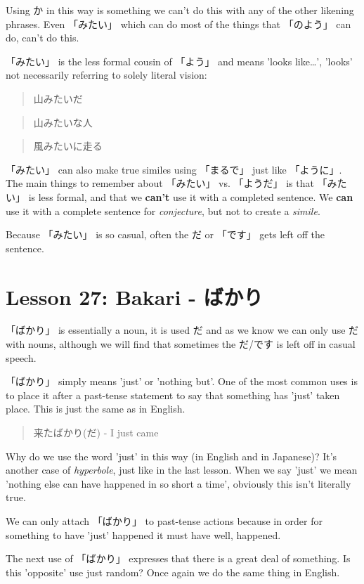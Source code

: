 \documentclass[11pt]{article}
\begin{document}
Using か in this way is something we can't do this with any of the other likening phrases. Even 「みたい」 which can do most of the things that 「のよう」 can do, can't do this.

「みたい」 is the less formal cousin of 「よう」 and means 'looks like\ldots{}', 'looks' not necessarily referring to solely literal vision:
\begin{quote}
山みたいだ
\end{quote}
\begin{quote}
山みたいな人
\end{quote}
\begin{quote}
風みたいに走る
\end{quote}
「みたい」 can also make true similes using 「まるで」 just like 「ように」. The main things to remember about 「みたい」 vs. 「ようだ」 is that 「みたい」 is less formal, and that we \textbf{can't} use it with a completed sentence. We \textbf{can} use it with a complete sentence for \emph{conjecture}, but not to create a \emph{simile}.

Because 「みたい」 is so casual, often the だ or 「です」 gets left off the sentence.
\section{Lesson 27: Bakari - ばかり}
\label{sec:orgb7dc63f}
「ばかり」 is essentially a noun, it is used だ and as we know we can only use だ with nouns, although we will find that sometimes the だ/です is left off in casual speech.

「ばかり」 simply means 'just' or 'nothing but'. One of the most common uses is to place it after a past-tense statement to say that something has 'just' taken place. This is just the same as in English.
\begin{quote}
来たばかり(だ) - I just came
\end{quote}
Why do we use the word 'just' in this way (in English and in Japanese)? It's another case of \emph{hyperbole}, just like in the last lesson. When we say 'just' we mean 'nothing else can have happened in so short a time', obviously this isn't literally true.

We can only attach 「ばかり」 to past-tense actions because in order for something to have 'just' happened it must have well, happened.

The next use of 「ばかり」 expresses that there is a great deal of something. Is this 'opposite' use just random? Once again we do the same thing in English.
\end{document}
